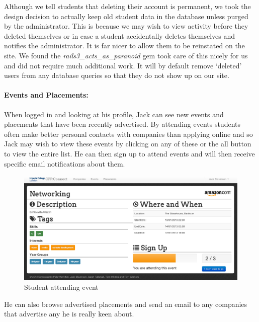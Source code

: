     Although we tell students that deleting their account is permanent, we took the design decision to actually keep old student data in the database unless purged by the administrator. This is because we may wish to view activity before they deleted themselves or in case a student accidentally deletes themselves and notifies the administrator. It is far nicer to allow them to be reinstated on the site. We found the \textit{rails3\_acts\_as\_paranoid}\cite{paranoid_gem} gem took care of this nicely for us and did not require much additional work. It will by default remove `deleted' users from any database queries so that they do not show up on our site.

  \paragraph{Events and Placements:}
    When logged in and looking at his profile, Jack can see new events and placements that have been recently advertised. By attending events students often make better personal contacts with companies than applying online and so Jack may wish to view these events by clicking on any of these or the all button to view the entire list. He can then sign up to attend events and will then receive specific email notifications about them.

    \begin{figure}[H]\centering
    \includegraphics[scale=0.3]{images/user_experiences/student/attend_event}
    \caption{Student attending event}
    \end{figure}

    He can also browse advertised placements and send an email to any companies that advertise any he is really keen about.

